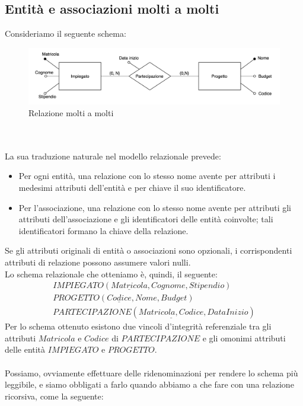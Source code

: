 \subsection{Entità e associazioni molti a molti}
Consideriamo il seguente schema:
    \begin{figure}[h!]
        \centering
        \includegraphics[scale = 0.5]{15/img5}
        \caption{Relazione molti a molti}
    \end{figure}\\\\
La sua traduzione naturale nel modello relazionale prevede:
    \begin{itemize}
        \item{Per ogni entità, una relazione con lo stesso nome avente per attributi i medesimi attributi dell'entità e per chiave il suo identificatore.}
        \item{Per l'associazione, una relazione con lo stesso nome avente per attributi gli attributi dell'associazione e gli identificatori delle entità coinvolte; tali identificatori formano la chiave della relazione.}
    \end{itemize}
Se gli attributi originali di entità o associazioni sono opzionali, i corrispondenti attributi di relazione possono assumere valori nulli.\\
Lo schema relazionale che otteniamo è, quindi, il seguente:
    \begin{equation}\begin{aligned}
        IMPIEGATO(\underline{Matricola}, Cognome, Stipendio)\\
        PROGETTO(\underline{Codice}, Nome, Budget)\\
        PARTECIPAZIONE(\underline{Matricola, Codice}, DataInizio)
    \end{aligned}\end{equation}
Per lo schema ottenuto esistono due vincoli d'integrità referenziale tra gli attributi $Matricola$ e $Codice$ di $PARTECIPAZIONE$ e gli omonimi attributi delle entità $IMPIEGATO$ e $PROGETTO$.\\\\
Possiamo, ovviamente effettuare delle ridenominazioni per rendere lo schema più leggibile, e siamo obbligati a farlo quando abbiamo a che fare con una relazione ricorsiva, come la seguente:
